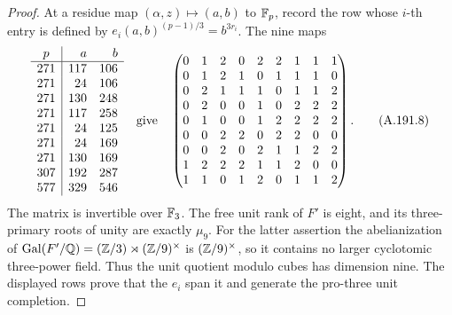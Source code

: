 \begin{proof}
At a residue map \((\alpha,z)\mapsto(a,b)\) to \(\mathbb F_p\),
record the row whose \(i\)-th entry is defined by
\(e_i(a,b)^{(p-1)/3}=b^{3r_i}\).
The nine maps
\[
\begin{array}{c|r r}
p&a&b\\ \hline
271&117&106\\271&24&106\\271&130&248\\
271&117&258\\271&24&125\\271&24&169\\
271&130&169\\307&192&287\\577&329&546
\end{array}
\quad\text{give}\quad
\begin{pmatrix}
0&1&2&0&2&2&1&1&1\\
0&1&2&1&0&1&1&1&0\\
0&2&1&1&1&0&1&1&2\\
0&2&0&0&1&0&2&2&2\\
0&1&0&0&1&2&2&2&2\\
0&0&2&2&0&2&2&0&0\\
0&0&2&0&2&1&1&2&2\\
1&2&2&2&1&1&2&0&0\\
1&1&0&1&2&0&1&1&2
\end{pmatrix}.
\tag{A.191.8}
\]
The matrix is invertible over \(\mathbb F_3\).  The free unit rank
of \(F'\) is eight, and its three-primary roots of unity are
exactly \(\mu_9\).  For the latter assertion the abelianization
of \(\operatorname{Gal}(F'/\mathbb Q)=(\mathbb Z/3)\rtimes(\mathbb Z/9)^\times\)
is \((\mathbb Z/9)^\times\), so it contains no larger cyclotomic
three-power field.  Thus the unit quotient modulo cubes has
dimension nine.  The displayed rows prove that the \(e_i\)
span it and generate the pro-three unit completion.


\end{proof}
